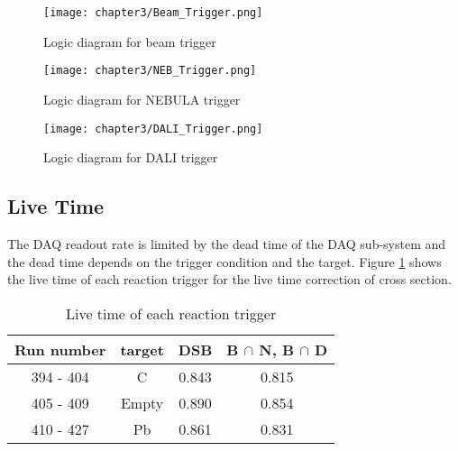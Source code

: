 \begin{figure}[h]
    \centering
    \hspace{0.5cm}
    \texttt{[image: chapter3/Beam\_Trigger.png]}
    \caption{Logic diagram for beam trigger}
    \label{fig:Beam_Trigger}
\end{figure}

\begin{figure}[h]
    \centering
    \texttt{[image: chapter3/NEB\_Trigger.png]}
    \caption{Logic diagram for NEBULA trigger}    
    \label{fig:NEB_Trigger}
\end{figure}

\clearpage

\begin{figure}[h]
    \centering
    \texttt{[image: chapter3/DALI\_Trigger.png]}
    \caption{Logic diagram for DALI trigger}
    \label{fig:DALI_Trigger}
\end{figure}


\subsection{Live Time}
The DAQ readout rate is limited by the dead time of the DAQ sub-system and the dead time depends on the trigger condition and the target. Figure \ref{fig:LiveTime} shows the live time of each reaction trigger for the live time correction of cross section.

\begin{table}[h]
    \centering
    \begin{tabular}{c|c|cc}
        \hline
        Run number & target & DSB & B $\cap$ N, B $\cap$ D \\
        \hline
        394 - 404 & C & 0.843 & 0.815 \\
        405 - 409 & Empty & 0.890 & 0.854 \\
        410 - 427 & Pb & 0.861 & 0.831 \\
        \hline
    \end{tabular}
    \caption{Live time of each reaction trigger}
    \label{fig:LiveTime}
\end{table}
